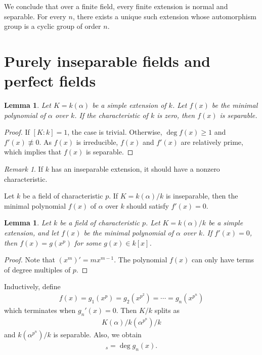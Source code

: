 \documentclass[12pt]{report}
\theoremstyle{plain}
\newtheorem{lemma}[theorem]{Lemma}
\theoremstyle{remark}
\newtheorem*{remark}{Remark}
\theoremstyle{definition}
\begin{document}
We conclude that over a finite field, every finite extension is normal and separable. For every $n$, there exists a unique such extension whose automorphism group is a cyclic group of order $n$.


\clearpage
\section{Purely inseparable fields and perfect fields}
\begin{lemma}
    Let $K=k(\alpha)$ be a simple extension of $k$. Let $f(x)$ be the minimal polynomial of $\alpha$ over $k$. If the characteristic of $k$ is zero, then $f(x)$ is separable.
\end{lemma}
\begin{proof}
    If $[K:k]=1$, the case is trivial. Otherwise, $\deg f(x)\ge 1$ and $f'(x)\not\equiv 0$. As $f(x)$ is irreducible, $f(x)$ and $f'(x)$ are relatively prime, which implies that $f(x)$ is separable.
\end{proof}
\begin{remark}
    If $k$ has an inseparable extension, it should have a nonzero characteristic.
\end{remark}

Let $k$ be a field of characteristic $p$. If $K=k(\alpha)/k$ is inseparable, then the minimal polynomial $f(x)$ of $\alpha$ over $k$ should satisfy $f'(x)=0$.

\begin{lemma}
    Let $k$ be a field of characteristic $p$. Let $K=k(\alpha)/k$ be a simple extension, and let $f(x)$ be the minimal polynomial of $\alpha$ over $k$. If $f'(x) = 0$, then $f(x) = g(x^p)$ for some $g(x)\in k[x]$.
\end{lemma}
\begin{proof}
    Note that $(x^m)'=mx^{m-1}$. The polynomial $f(x)$ can only have terms of degree multiples of $p$.
\end{proof}

Inductively, define
\begin{align*}
    f(x) = g_1(x^p) = g_2(x^{p^2}) = \cdots=g_n(x^{p^n}) 
\end{align*}
which terminates when $g_n'(x) = 0$. Then $K/k$ splits as
\begin{align*}
    K(\alpha) / k(\alpha^{p^n})/k
\end{align*}
and
$k(\alpha^{p^n})/k$ is separable. Also, we obtain
\begin{align*}
    [K:k]_s = \deg g_n(x).
\end{align*}
\end{document}
